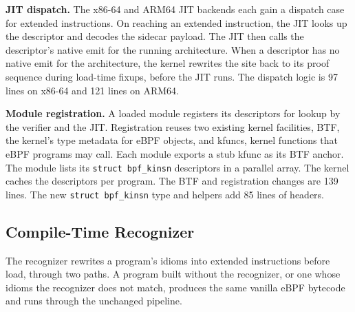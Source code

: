 \noindent\textbf{JIT dispatch.}
The x86-64 and ARM64 JIT backends each gain a dispatch case for extended instructions.
On reaching an extended instruction, the JIT looks up the descriptor and decodes the sidecar payload.
The JIT then calls the descriptor's native emit for the running architecture.
When a descriptor has no native emit for the architecture, the kernel rewrites the site back to its proof sequence during load-time fixups, before the JIT runs.
The dispatch logic is 97 lines on x86-64 and 121 lines on ARM64.

\noindent\textbf{Module registration.}
A loaded module registers its descriptors for lookup by the verifier and the JIT.
Registration reuses two existing kernel facilities, BTF, the kernel's type metadata for eBPF objects, and kfuncs, kernel functions that eBPF programs may call.
Each module exports a stub kfunc as its BTF anchor.
The module lists its \texttt{struct bpf\_kinsn} descriptors in a parallel array.
The kernel caches the descriptors per program.
The BTF and registration changes are 139 lines.
The new \texttt{struct bpf\_kinsn} type and helpers add 85 lines of headers.

\subsection{Compile-Time Recognizer}
\label{subsec:llvm}

The recognizer rewrites a program's idioms into extended instructions before load, through two paths.
A program built without the recognizer, or one whose idioms the recognizer does not match, produces the same vanilla eBPF bytecode and runs through the unchanged pipeline.

